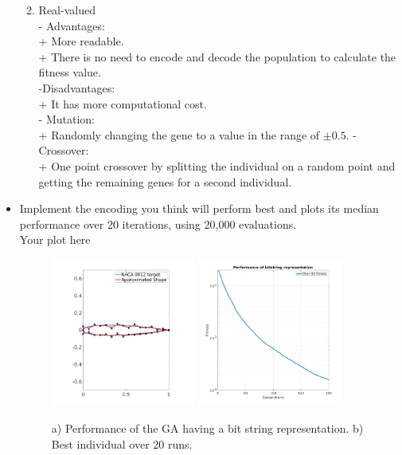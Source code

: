 \documentclass{article}
\begin{document}
\begin{itemize}
\begin{enumerate}
{		\color{black}}
		
		\item {Real-valued
		\\\color{blue}
		- Advantages:\\
		+ More readable. \\
		+ There is no need to encode and decode the population to calculate the fitness value. \\
		-Disadvantages: \\
		+ It has more computational cost. \\
		- Mutation: \\
		+ Randomly changing the gene to a value in the range of $\pm 0.5$.
		- Crossover:\\
		+ One point crossover by splitting the individual on a random point and getting the remaining genes for a second individual. \\
		 \color{black}}
	\end{enumerate}
	\item Implement the encoding you think will perform best and plots its median performance over 20 iterations, using 20,000 evaluations.
	\\\color{blue}Your plot here\color{black}
	\begin{figure}[h!]
		\centering
		\includegraphics[width=0.45\textwidth]{img/Best_bit_GA_20_20000.png}
		\includegraphics[width=0.45\textwidth]{img/GA_bit_fit.png}
		\caption{a) Performance of the GA having a bit string representation. b) Best individual over 20 runs. \label{fig:xxx1}}
	\end{figure}
	


\end{itemize}
\end{document}
